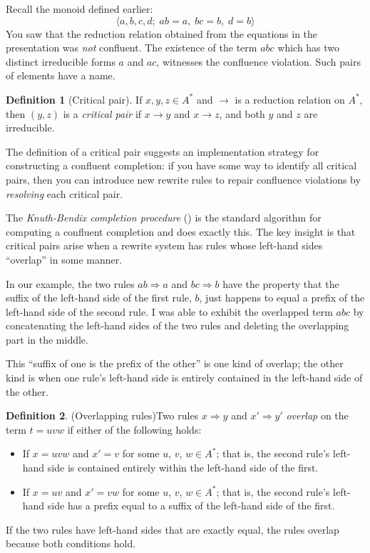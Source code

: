 \documentclass[a4paper,headsepline,bibliography=totoc,toc=flat,fleqn,twoside=semi]{scrbook}
\theoremstyle{definition}
\newtheorem{definition}{Definition}[chapter]
\theoremstyle{definition}
\theoremstyle{definition}
\begin{document}
Recall the monoid defined earlier:
\[\langle a, b, c, d;\; ab=a,\; bc=b,\; d=b\rangle\]
You saw that the reduction relation obtained from the equations in the presentation was \emph{not} confluent. The existence of the term $abc$ which has two distinct irreducible forms $a$ and $ac$, witnesses the confluence violation. Such pairs of elements have a name.

\begin{definition}[Critical pair] If $x, y, z\in A^*$ and $\rightarrow$ is a reduction relation on $A^*$, then $(y, z)$ is a \emph{critical pair} if $x\rightarrow y$ and $x\rightarrow z$, and both $y$ and $z$ are irreducible.
\end{definition}

The definition of a critical pair suggests an implementation strategy for constructing a confluent completion: if you have some way to identify all critical pairs, then you can introduce new rewrite rules to repair confluence violations by \emph{resolving} each critical pair.

The \emph{Knuth-Bendix completion procedure} (\cite{Knuth1983}) is the standard algorithm for computing a confluent completion and does exactly this. The key insight is that critical pairs arise when a rewrite system has rules whose left-hand sides ``overlap'' in some manner.

In our example, the two rules $ab\Rightarrow a$ and $bc\Rightarrow b$ have the property that the suffix of the left-hand side of the first rule, $b$, just happens to equal a prefix of the left-hand side of the second rule. I was able to exhibit the overlapped term $abc$ by concatenating the left-hand sides of the two rules and deleting the overlapping part in the middle.

This ``suffix of one is the prefix of the other'' is one kind of overlap; the other kind is when one rule's left-hand side is entirely contained in the left-hand side of the other.

\begin{definition}(Overlapping rules)\label{overlappingrules}
Two rules $x\Rightarrow y$ and $x'\Rightarrow y'$ \emph{overlap} on the term $t=uvw$ if either of the following holds:
\begin{itemize}
\item If $x=uvw$ and $x'=v$ for some $u$, $v$, $w\in A^*$; that is, the second rule's left-hand side is contained entirely within the left-hand side of the first.
\item If $x=uv$ and $x'=vw$ for some $u$, $v$, $w\in A^*$; that is, the second rule's left-hand side has a prefix equal to a suffix of the left-hand side of the first.
\end{itemize}
If the two rules have left-hand sides that are exactly equal, the rules overlap because both conditions hold.
\end{definition}
\end{document}
